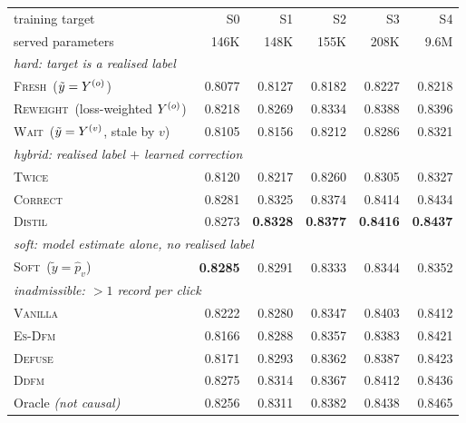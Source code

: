 \begin{tabular}{lrrrrr}
\toprule
training target & S0 & S1 & S2 & S3 & S4\\
served parameters & 146K & 148K & 155K & 208K & 9.6M\\
\midrule
\multicolumn{6}{l}{\emph{hard: target is a realised label}}\\
\quad \textsc{Fresh}\ ($\tilde y = Y^{(o)}$) & 0.8077 & 0.8127 & 0.8182 & 0.8227 & 0.8218\\
\quad \textsc{Reweight}\ (loss-weighted $Y^{(o)}$) & 0.8218 & 0.8269 & 0.8334 & 0.8388 & 0.8396\\
\quad \textsc{Wait}\ ($\tilde y = Y^{(v)}$, stale by $v$) & 0.8105 & 0.8156 & 0.8212 & 0.8286 & 0.8321\\
\multicolumn{6}{l}{\emph{hybrid: realised label $+$ learned correction}}\\
\quad \textsc{Twice} & 0.8120 & 0.8217 & 0.8260 & 0.8305 & 0.8327\\
\quad \textsc{Correct} & 0.8281 & 0.8325 & 0.8374 & 0.8414 & 0.8434\\
\quad \textsc{Distil} & 0.8273 & \textbf{0.8328} & \textbf{0.8377} & \textbf{0.8416} & \textbf{0.8437}\\
\multicolumn{6}{l}{\emph{soft: model estimate alone, no realised label}}\\
\quad \textsc{Soft}\ ($\tilde y = \hat p_v$) & \textbf{0.8285} & 0.8291 & 0.8333 & 0.8344 & 0.8352\\
\midrule
\multicolumn{6}{l}{\emph{inadmissible: $>1$ record per click}}\\
\quad \textsc{Vanilla} & 0.8222 & 0.8280 & 0.8347 & 0.8403 & 0.8412\\
\quad \textsc{Es-Dfm} & 0.8166 & 0.8288 & 0.8357 & 0.8383 & 0.8421\\
\quad \textsc{Defuse} & 0.8171 & 0.8293 & 0.8362 & 0.8387 & 0.8423\\
\quad \textsc{Ddfm} & 0.8275 & 0.8314 & 0.8367 & 0.8412 & 0.8436\\
\midrule
\quad Oracle \emph{(not causal)} & 0.8256 & 0.8311 & 0.8382 & 0.8438 & 0.8465\\
\bottomrule
\end{tabular}
